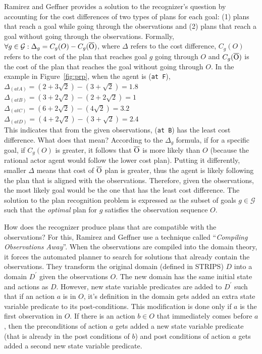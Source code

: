 Ramirez and Geffner provides a solution to the recognizer's question by accounting for the cost differences of two types of plans for each goal: (1) plans that reach a goal while going through the observations and (2) plans that reach a goal without going through the observations. Formally,
$\forall g \in \mathcal{G}: \Delta_{g} = C_g(O) - C_g(\overline{\rm O})$, where $\Delta$ refers to the cost difference, $C_g(O)$ refers to the cost of the plan that reaches goal $g$ going through $O$ and $C_g(\overline{\rm O})$ is the cost of the plan that reaches the goal without going through $O$. In the example in Figure~\ref{fig:prp}, when the agent is (\texttt{at F}),\\
$\Delta_{(at A)}= (2+3\sqrt{2}) - (3+\sqrt{2})=1.8$\\
$\Delta_{(at B)}= (3+2\sqrt{2}) - (2+2\sqrt{2})=1$\\
$\Delta_{(at C)}= (6+2\sqrt{2}) - (4\sqrt{2})=3.2$\\
$\Delta_{(at D)}= (4+2\sqrt{2}) - (3+\sqrt{2})=2.4$\\
This indicates that from the given observations, (\texttt{at B}) has the least cost difference. What does that mean? 
According to the $\Delta_g$ formula, if for a specific goal, if $C_g(O)$ is greater, it follows that $\overline{\rm O}$ is more likely than $O$ (because the rational actor agent would follow the lower cost plan). 
Putting it differently, smaller $\Delta$ means that cost of $\overline{\rm O}$ plan is greater, thus the agent is likely following the plan that is aligned with the observations. 
Therefore, given the observations, the most likely goal would be the one that has the least cost difference. 
The solution to the plan recognition problem is expressed as the subset of goals $g\in \mathcal{G}$ such that the \textit{optimal} plan for $g$ satisfies the observation sequence $O$.

How does the recognizer produce plans that are compatible with the observations? 
For this, Ramirez and Geffner use a technique called ``\textit{Compiling Observations Away}''. When the observations are compiled into the domain theory, it forces the automated planner to search for solutions that already contain the observations. 
They transform the original domain (defined in STRIPS) $D$ into a domain $D^\prime$ given the observations $O$. The new domain has the same initial state and actions as $D$. 
However, new state variable predicates are added to $D^\prime$ such that if an action $a$ is in $O$, it's definition in the domain gets added an extra state variable predicate to its post-conditions. 
This modification is done only if $a$ is the first observation in $O$. 
If there is an action $b \in O$ that immediately comes before $a$, then the preconditions of action $a$ gets added a new state variable predicate (that is already in the post conditions of $b$) and post conditions of action $a$ gets added a second new state variable predicate.

